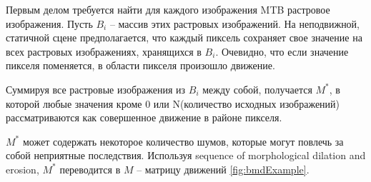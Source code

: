 Первым делом требуется найти для каждого изображения MTB растровое изображения. Пусть $B_i$ -- массив этих растровых изображений. На неподвижной, статичной сцене предполагается, что каждый пиксель сохраняет свое значение на всех растровых изображениях, хранящихся в $B_i$. Очевидно, что если значение пикселя поменяется, в области пикселя произошло движение. 

Суммируя все растровые изображения из $B_i$ между собой, получается $M^*$, в которой любые значения кроме 0 или N(количество исходных изображений) рассматриваются как совершенное движение в районе пикселя. 

$M^*$ может содержать некоторое количество шумов, которые могут повлечь за собой неприятные последствия. Используя sequence of morphological dilation and erosion, $M^*$ переводится в $M$ -- матрицу движений \ref{fig:bmdExample}.

